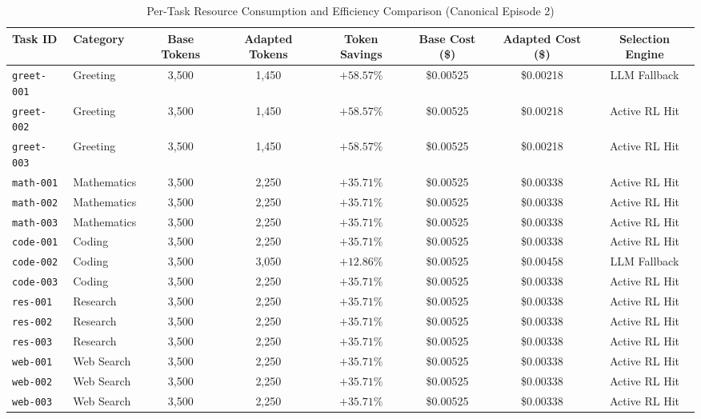 \begin{table}[!t]
\centering
\caption{Per-Task Resource Consumption and Efficiency Comparison (Canonical Episode 2)}
\label{tab:per_task_resources}
\footnotesize
\begin{tabular}{llcccccc}
\toprule
\textbf{Task ID} & \textbf{Category} & \textbf{Base Tokens} & \textbf{Adapted Tokens} & \textbf{Token Savings} & \textbf{Base Cost (\$) } & \textbf{Adapted Cost (\$) } & \textbf{Selection Engine} \\
\midrule
\texttt{greet-001} & Greeting & 3,500 & 1,450 & $+58.57\%$ & \$0.00525 & \$0.00218 & LLM Fallback \\
\texttt{greet-002} & Greeting & 3,500 & 1,450 & $+58.57\%$ & \$0.00525 & \$0.00218 & Active RL Hit \\
\texttt{greet-003} & Greeting & 3,500 & 1,450 & $+58.57\%$ & \$0.00525 & \$0.00218 & Active RL Hit \\
\texttt{math-001} & Mathematics & 3,500 & 2,250 & $+35.71\%$ & \$0.00525 & \$0.00338 & Active RL Hit \\
\texttt{math-002} & Mathematics & 3,500 & 2,250 & $+35.71\%$ & \$0.00525 & \$0.00338 & Active RL Hit \\
\texttt{math-003} & Mathematics & 3,500 & 2,250 & $+35.71\%$ & \$0.00525 & \$0.00338 & Active RL Hit \\
\texttt{code-001} & Coding & 3,500 & 2,250 & $+35.71\%$ & \$0.00525 & \$0.00338 & Active RL Hit \\
\texttt{code-002} & Coding & 3,500 & 3,050 & $+12.86\%$ & \$0.00525 & \$0.00458 & LLM Fallback \\
\texttt{code-003} & Coding & 3,500 & 2,250 & $+35.71\%$ & \$0.00525 & \$0.00338 & Active RL Hit \\
\texttt{res-001} & Research & 3,500 & 2,250 & $+35.71\%$ & \$0.00525 & \$0.00338 & Active RL Hit \\
\texttt{res-002} & Research & 3,500 & 2,250 & $+35.71\%$ & \$0.00525 & \$0.00338 & Active RL Hit \\
\texttt{res-003} & Research & 3,500 & 2,250 & $+35.71\%$ & \$0.00525 & \$0.00338 & Active RL Hit \\
\texttt{web-001} & Web Search & 3,500 & 2,250 & $+35.71\%$ & \$0.00525 & \$0.00338 & Active RL Hit \\
\texttt{web-002} & Web Search & 3,500 & 2,250 & $+35.71\%$ & \$0.00525 & \$0.00338 & Active RL Hit \\
\texttt{web-003} & Web Search & 3,500 & 2,250 & $+35.71\%$ & \$0.00525 & \$0.00338 & Active RL Hit \\

\end{tabular}
\end{table}
